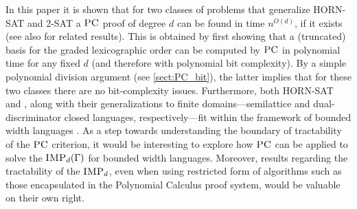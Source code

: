 \documentclass[11pt]{article}
\newcommand{\sos}{\text{\sc{SoS}}}
\newcommand{\IMP}{\textsc{IMP}}
\newcommand{\PC}{\textsc{PC}}
\newcommand{\1}{\textbf{1}}
\newcommand{\GB}{\text{Gr\"{o}bner} }
\begin{document}


In this paper it is shown that for two classes of problems that generalize \textsc{HORN-SAT} and \textsc{2-SAT} a $\PC$ proof of degree $d$ can be found in time $n^{O(d)}$, if it exists (see also \cite{BharathiM21} for related results). This is obtained by first showing that a (truncated) \GB basis for the graded lexicographic order can be computed by $\PC$ in polynomial time for any fixed $d$ (and therefore with polynomial bit complexity). By a simple polynomial division argument (see \cref{sect:PC_bit}), the latter implies that for these two classes there are no bit-complexity issues. Furthermore, both \textsc{HORN-SAT} and , along with their generalizations to finite domains---semilattice and dual-discriminator closed languages, respectively---fit within the framework of bounded width languages \cite{JEAVONS_TRACTABLE_CONSTRAINTS}. As a step towards understanding the boundary of tractability of the $\PC$ criterion, it would be interesting to explore how $\PC$ can be applied to solve the $\IMP_d(\Gamma)$ for bounded width languages. Moreover, results regarding the tractability of the $\IMP_d$, even when using restricted form of algorithms such as those encapsulated in the Polynomial Calculus proof system, would be valuable on their own right.
\end{document}
